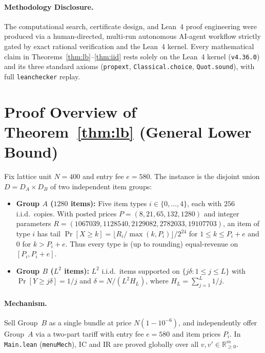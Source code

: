 \documentclass[11pt]{article}
\newcommand{\R}{\mathbb{R}}
\begin{document}
\paragraph{Methodology Disclosure.}
The computational search, certificate design, and Lean~4 proof engineering were produced via a human-directed, multi-run autonomous AI-agent workflow strictly gated by exact rational verification and the Lean~4 kernel. Every mathematical claim in Theorems~\ref{thm:lb}--\ref{thm:iid} rests solely on the Lean~4 kernel (\texttt{v4.36.0}) and its three standard axioms (\texttt{propext}, \texttt{Classical.choice}, \texttt{Quot.sound}), with full \texttt{leanchecker} replay.

\section{Proof Overview of Theorem~\ref{thm:lb} (General Lower Bound)}

Fix lattice unit $N = 400$ and entry fee $e = 580$. The instance is the disjoint union $D = D_A \times D_B$ of two independent item groups:
\begin{itemize}
  \item \textbf{Group $A$ ($1280$ items):} Five item types $i \in \{0,\dots,4\}$, each with $256$ i.i.d.\ copies. With posted prices $P = (8, 21, 65, 132, 1280)$ and integer parameters $R = (1067039, 1128540, 2129082, 2782033, 19107703)$, an item of type $i$ has tail $\Pr[X \ge k] = \lfloor R_i / \max(k, P_i) \rfloor / 2^{24}$ for $1 \le k \le P_i + e$ and $0$ for $k > P_i + e$. Thus every type is (up to rounding) equal-revenue on $[P_i, P_i + e]$.
  \item \textbf{Group $B$ ($L^2$ items):} $L^2$ i.i.d.\ items supported on $\{j\delta : 1 \le j \le L\}$ with $\Pr[Y \ge j\delta] = 1/j$ and $\delta = N / (L^2 H_L)$, where $H_L = \sum_{j=1}^L 1/j$.
\end{itemize}

\paragraph{Mechanism.}
Sell Group~$B$ as a single bundle at price $N(1 - 10^{-6})$, and independently offer Group~$A$ via a two-part tariff with entry fee $e = 580$ and item prices $P_i$. In \texttt{Main.lean} (\texttt{menuMech}), IC and IR are proved globally over all $v, v' \in \R_{\ge 0}^m$.
\end{document}
